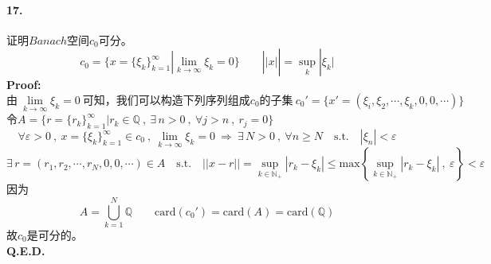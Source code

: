 \paragraph*{17.}证明$Banach$空间$c_0$可分。
\[c_0=\{x=\{\xi_k\}_{k=1}^{\infty}|\lim_{k \to \infty}\xi_k=0\} \qquad ||x||=\mathop \text{sup}\limits_{k}|\xi_k|\]
\textbf{Proof:}\\
\[\text{由} \ \lim_{k \to \infty}\xi_k=0 \ \text{可知，我们可以构造下列序列组成$c_0$的子集} \ c_0'=\{x'=(\xi_i,\xi_2,\cdots,\xi_k,0,0,\cdots)\}\]
令$A=\{r=\{r_k\}_{k=1}^{\infty}|r_k \in \mathbb{Q} \ , \ \exists \, n>0 \ , \ \forall j>n \ , \ r_j=0\}$
\[\forall \varepsilon>0 \ , \ x=\{\xi_k\}_{k=1}^{\infty} \in c_0 \ , \ \lim_{k \to \infty}\xi_k=0 \ \Rightarrow \ \exists \, N>0 \ , \ \forall n \geq N \quad \text{s.t.} \quad |\xi_n|<\varepsilon\]
\[\exists \, r=(r_1,r_2,\cdots,r_N,0,0,\cdots) \in A \quad \text{s.t.} \quad ||x-r||=\mathop \text{sup}\limits_{k \in \mathbb{N}_+}|r_k-\xi_k| \leq \text{max}\left\{\mathop \text{sup}\limits_{k \in \mathbb{N}_+}|r_k-\xi_k| \ , \ \varepsilon\right\}<\varepsilon\]
因为
\[A=\bigcup_{k=1}^N\mathbb{Q} \qquad \text{card}(c_0')=\text{card}(A)=\text{card}(\mathbb{Q})\]
故$c_0$是可分的。\\
\textbf{Q.E.D.}

